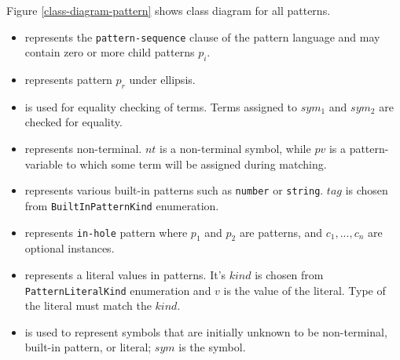 Figure \ref{class-diagram-pattern} shows class diagram for all patterns.

\begin{itemize}
\item
\PatternSequence \space represents the \texttt{pattern-sequence} clause of the pattern language and may contain zero or more child patterns $p_i$. 

\item 
\PatternRepeat \space represents pattern $p_r$ under ellipsis.

\item
\PatternCheckConstraint is used for equality checking of terms. Terms assigned to $sym_1$ and $sym_2$ are checked for equality.

\item 
\NonTerminal \space represents non-terminal. $nt$ is a non-terminal symbol, while $pv$ is a pattern-variable to which some term will be assigned during matching. 

\item
\BuiltInPattern \space represents various built-in patterns such as \texttt{number} or \texttt{string}. $tag$ is chosen from \texttt{BuiltInPatternKind} enumeration.

\item
\PatternInHole \space represents \texttt{in-hole} pattern where $p_1$ and $p_2$ are patterns, and $c_1, ..., c_n$ are optional \ConstraintCheckNoArg instances.

\item 
\LiteralPattern \space represents a literal values in patterns. It's $kind$ is chosen from \texttt{PatternLiteralKind} enumeration and $v$ is the value of the literal. Type of the literal must match the $kind$.

\item 
\UnresolvedSymbol is used to represent symbols that are initially unknown to be non-terminal, built-in pattern, or literal; $sym$ is the symbol.

\end{itemize}
